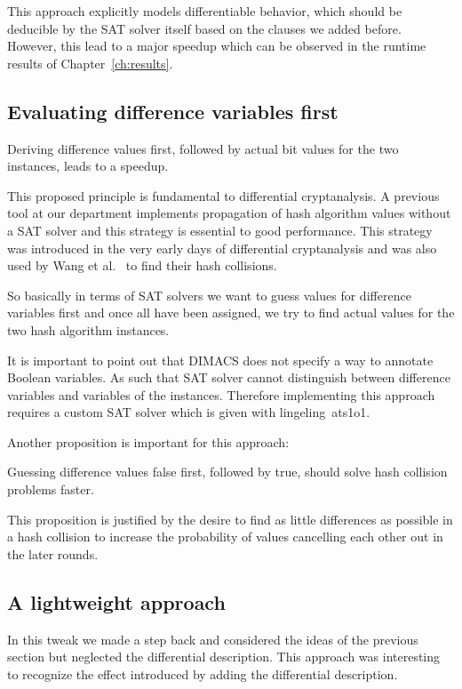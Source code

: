 This approach explicitly models differentiable behavior, which should be deducible
by the SAT solver itself based on the clauses we added before.
However, this lead to a major speedup which can be observed in the runtime results
of Chapter~\ref{ch:results}.

\newpage
\subsection{Evaluating difference variables first}
\label{sec:enc-diff-desc-ocnf}
%
\begin{prop}
  Deriving difference values first, followed by actual bit values for the two instances,
  leads to a speedup.
\end{prop}

This proposed principle is fundamental to differential cryptanalysis. A previous tool
at our department implements propagation of hash algorithm values without a SAT solver
and this strategy is essential to good performance. This strategy was introduced
in the very early days of differential cryptanalysis and was also used by Wang et
al.~\cite{wang2004} to find their hash collisions.

So basically in terms of SAT solvers we want to guess values for difference variables
first and once all have been assigned, we try to find actual values for the two
hash algorithm instances.

It is important to point out that DIMACS does not specify a way to annotate Boolean
variables. As such that SAT solver cannot distinguish between difference variables
and variables of the instances. Therefore implementing this approach requires a custom
SAT solver which is given with lingeling~ats1o1.

Another proposition is important for this approach:

\begin{prop}
  \label{prop:false-first}
  Guessing difference values false first, followed by true,
  should solve hash collision problems faster.
\end{prop}

This proposition is justified by the desire to find as little differences as possible
in a hash collision to increase the probability of values cancelling each other out
in the later rounds.

\subsection{A lightweight approach}
\label{sec:enc-lightweight}
%
In this tweak we made a step back and considered the ideas of the previous
section but neglected the differential description. This approach was interesting
to recognize the effect introduced by adding the differential description.

